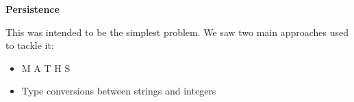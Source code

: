 \LARGE \textbf{Persistence} \normalsize

This was intended to be the simplest problem. 
We saw two main approaches used to tackle it:

\begin{itemize}
    \item M A T H S
    \item Type conversions between strings and integers
\end{itemize}